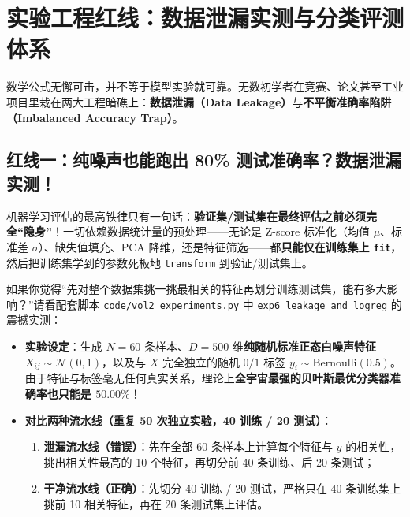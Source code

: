 \section{实验工程红线：数据泄漏实测与分类评测体系}
\label{sec:ch6-leakage-metrics}

数学公式无懈可击，并不等于模型实验就可靠。无数初学者在竞赛、论文甚至工业项目里栽在两大工程暗礁上：\textbf{数据泄漏（Data Leakage）}与\textbf{不平衡准确率陷阱（Imbalanced Accuracy Trap）}。

\subsection{红线一：纯噪声也能跑出 80\% 测试准确率？数据泄漏实测！}
\label{subsec:ch6-leakage}

机器学习评估的最高铁律只有一句话：\textbf{验证集/测试集在最终评估之前必须完全“隐身”}！一切依赖数据统计量的预处理——无论是 Z-score 标准化（均值 $\mu$、标准差 $\sigma$）、缺失值填充、PCA 降维，还是特征筛选——都\textbf{只能仅在训练集上 \texttt{fit}}，然后把训练集学到的参数死板地 \texttt{transform} 到验证/测试集上。

如果你觉得“先对整个数据集挑一挑最相关的特征再划分训练测试集，能有多大影响？”请看配套脚本 \texttt{code/vol2\_experiments.py} 中 \texttt{exp6\_leakage\_and\_logreg} 的震撼实测：
\begin{itemize}
  \item \textbf{实验设定}：生成 $N=60$ 条样本、$D=500$ 维\textbf{纯随机标准正态白噪声特征} $X_{ij} \sim \mathcal{N}(0,1)$，以及与 $X$ 完全独立的随机 $0/1$ 标签 $y_i \sim \mathrm{Bernoulli}(0.5)$。由于特征与标签毫无任何真实关系，理论上\textbf{全宇宙最强的贝叶斯最优分类器准确率也只能是 $50.00\%$}！
  \item \textbf{对比两种流水线（重复 50 次独立实验，40 训练 / 20 测试）}：
  \begin{enumerate}
    \item \textbf{泄漏流水线（错误）}：先在全部 60 条样本上计算每个特征与 $y$ 的相关性，挑出相关性最高的 10 个特征，再切分前 40 条训练、后 20 条测试；
    \item \textbf{干净流水线（正确）}：先切分 40 训练 / 20 测试，严格只在 40 条训练集上挑前 10 相关特征，再在 20 条测试集上评估。
  \end{enumerate}
\end{itemize}

